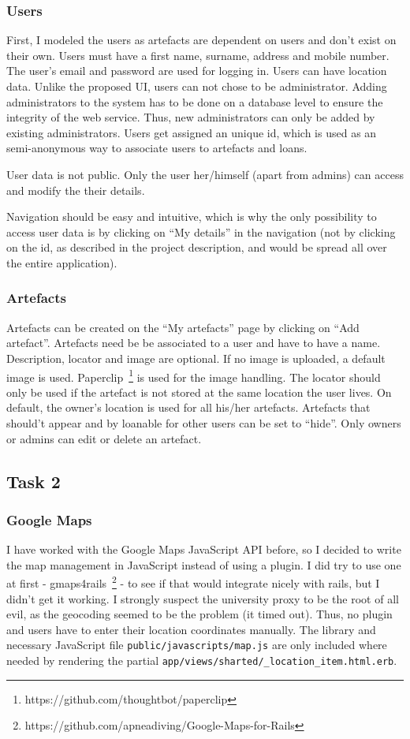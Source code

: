 \documentclass[fontsize=12pt,paper=a4]{scrartcl}
\begin{document}
\subsubsection{Users}
First, I modeled the users as artefacts are dependent on users and don't exist on their own. Users must have a first name, surname, address and mobile number. The user's email and password are used for logging in. Users can have location data. Unlike the proposed UI, users can not chose to be administrator. Adding administrators to the system has to be done on a database level to ensure the integrity of the web service. Thus, new administrators can only be added by existing administrators. Users get assigned an unique id, which is used as an semi-anonymous way to associate users to artefacts and loans.

User data is not public. Only the user her/himself (apart from admins) can access and modify the their details.  

Navigation should be easy and intuitive, which is why the only possibility to access user data is by clicking on ``My details'' in the navigation (not by clicking on the id, as described in the project description, and would be spread all over the entire application).

\subsubsection{Artefacts}
Artefacts can be created on the ``My artefacts'' page by clicking on ``Add artefact''. Artefacts need be be associated to a user and have to have a name. Description, locator and image are optional.
If no image is uploaded, a default image is used. Paperclip~\footnote{https://github.com/thoughtbot/paperclip} is used for the image handling. The locator should only be used if the artefact is not stored at the same location the user lives. On default, the owner's location is used for all his/her artefacts. Artefacts that should't appear and by loanable for other users can be set to ``hide''. Only owners or admins can edit or delete an artefact. 

\subsection{Task 2}
\subsubsection{Google Maps}
I have worked with the Google Maps JavaScript API before, so I decided to write the map management in JavaScript instead of using a plugin. I did try to use one at first - gmaps4rails~\footnote{https://github.com/apneadiving/Google-Maps-for-Rails} - to see if that would integrate nicely with rails, but I didn't get it working. I strongly suspect the university proxy to be the root of all evil, as the geocoding seemed to be the problem (it timed out). Thus, no plugin and users have to enter their location coordinates manually. The library and necessary JavaScript file \verb|public/javascripts/map.js| are only included where needed by rendering the partial \verb|app/views/sharted/_location_item.html.erb|.
\end{document}
